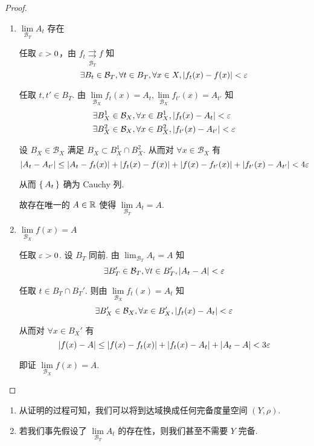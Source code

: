 \begin{proof}
    \begin{enumerate}
        \item $\lim\limits_{\mathcal{B}_T}A_t$ 存在
        
        任取 $\varepsilon>0$，由 $f_t\underset{\mathcal{B}_T}{\rightrightarrows}f$ 知
$$
\exists B_t\in\mathcal{B}_T,\forall t\in B_T,\forall x\in X,\left\lvert{f_t(x)-f(x)}\right\rvert<\varepsilon
$$

        任取 $t,t'\in B_T$. 由 $\lim\limits_{\mathcal{B}_X}f_t(x)=A_t,\lim\limits_{\mathcal{B}_X}f_{t'}(x)=A_{t'}$ 知
$$
\begin{aligned}
    &\exists B_X^1\in\mathcal{B}_X,\forall x\in B_X^1,\left\lvert{f_t(x)-A_t}\right\rvert<\varepsilon\\
    &\exists B_X^2\in\mathcal{B}_X,\forall x\in B_X^2,\left\lvert{f_{t'}(x)-A_{t'}}\right\rvert<\varepsilon
\end{aligned}
$$

        设 $B_X\in\mathcal{B}_X$ 满足 $B_X\subset B_X^1\cap B_X^2$. 从而对 $\forall x\in\mathcal{B}_X$ 有
$$
\left\lvert{A_t-A_{t'}}\right\rvert\le\left\lvert{A_t-f_t(x)}\right\rvert+\left\lvert{f_t(x)-f(x)}\right\rvert+\left\lvert{f(x)-f_{t'}(x)}\right\rvert+\left\lvert{f_{t'}(x)-A_{t'}}\right\rvert<4\varepsilon
$$

        从而 $\set{A_t}$ 确为 Cauchy 列.

        故存在唯一的 $A\in\mathbb{R}$ 使得 $\lim\limits_{\mathcal{B}_T}A_t=A$.

        \item $\lim\limits_{\mathcal{B}_X}f(x)=A$
        
        任取 $\varepsilon>0$. 设 $B_T$ 同前. 由 $\lim_{\mathcal{B}_T}A_t=A$ 知
$$
\exists B_T'\in\mathcal{B}_T,\forall t\in B_T',\left\lvert{A_t-A}\right\rvert<\varepsilon
$$

        任取 $t\in B_T\cap B_T'$. 则由 $\lim\limits_{\mathcal{B}_X}f_t(x)=A_t$ 知
$$
\exists B_X'\in\mathcal{B}_X,\forall x\in B_X',\left\lvert{f_t(x)-A_t}\right\rvert<\varepsilon
$$

        从而对 $\forall x\in B_X'$ 有
$$
\left\lvert{f(x)-A}\right\rvert\le\left\lvert{f(x)-f_t(x)}\right\rvert+\left\lvert{f_t(x)-A_t}\right\rvert+\left\lvert{A_t-A}\right\rvert<3\varepsilon
$$

        即证 $\lim\limits_{\mathcal{B}_X}f(x)=A$.
    \end{enumerate}
\end{proof}

\begin{hint}
    \begin{enumerate}
        \item 从证明的过程可知，我们可以将到达域换成任何完备度量空间 $(Y,\rho)$.
        
        \item 若我们事先假设了 $\lim\limits_{\mathcal{B}_T}A_t$ 的存在性，则我们甚至不需要 $Y$ 完备.
    \end{enumerate}
\end{hint}

